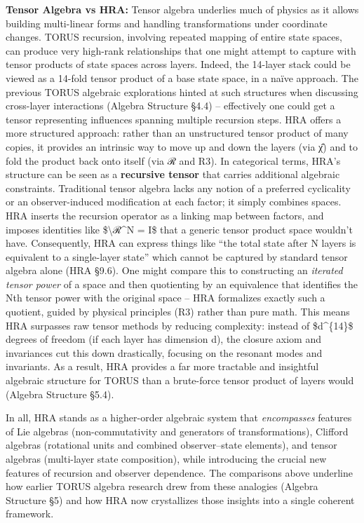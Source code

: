 \documentclass[]{article}
\begin{document}
\textbf{Tensor Algebra vs HRA:} Tensor algebra underlies much of physics
as it allows building multi-linear forms and handling transformations
under coordinate changes. TORUS recursion, involving repeated mapping of
entire state spaces, can produce very high-rank relationships that one
might attempt to capture with tensor products of state spaces across
layers. Indeed, the 14-layer stack could be viewed as a 14-fold tensor
product of a base state space, in a naïve approach. The previous TORUS
algebraic explorations hinted at such structures when discussing
cross-layer interactions (Algebra Structure §4.4) -- effectively one
could get a tensor representing influences spanning multiple recursion
steps. HRA offers a more structured approach: rather than an
unstructured tensor product of many copies, it provides an intrinsic way
to move up and down the layers (via χ̂) and to fold the product back onto
itself (via ℛ and R3). In categorical terms, HRA's structure can be seen
as a \textbf{recursive tensor} that carries additional algebraic
constraints. Traditional tensor algebra lacks any notion of a preferred
cyclicality or an observer-induced modification at each factor; it
simply combines spaces. HRA inserts the recursion operator as a linking
map between factors, and imposes identities like
\$\textbackslash{}ℛ\^{}N = I\$ that a generic tensor product space
wouldn't have. Consequently, HRA can express things like ``the total
state after N layers is equivalent to a single-layer state'' which
cannot be captured by standard tensor algebra alone (HRA §9.6). One
might compare this to constructing an \emph{iterated tensor power} of a
space and then quotienting by an equivalence that identifies the Nth
tensor power with the original space -- HRA formalizes exactly such a
quotient, guided by physical principles (R3) rather than pure math. This
means HRA surpasses raw tensor methods by reducing complexity: instead
of \$d\^{}\{14\}\$ degrees of freedom (if each layer has dimension d),
the closure axiom and invariances cut this down drastically, focusing on
the resonant modes and invariants. As a result, HRA provides a far more
tractable and insightful algebraic structure for TORUS than a
brute-force tensor product of layers would (Algebra Structure §5.4).

In all, HRA stands as a higher-order algebraic system that
\emph{encompasses} features of Lie algebras (non-commutativity and
generators of transformations), Clifford algebras (rotational units and
combined observer--state elements), and tensor algebras (multi-layer
state composition), while introducing the crucial new features of
recursion and observer dependence. The comparisons above underline how
earlier TORUS algebra research drew from these analogies (Algebra
Structure §5) and how HRA now crystallizes those insights into a single
coherent framework.
\end{document}
